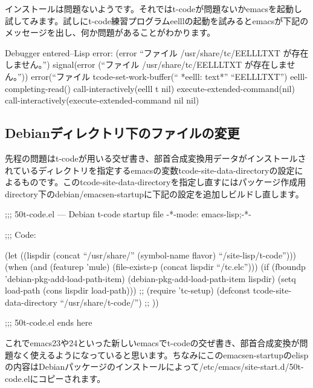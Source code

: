 \documentclass[mingoth,a4paper]{jsarticle}
\begin{document}
インストールは問題ないようです。それではt-codeが問題ないかemacsを起動し試してみます。試しにt-code練習プログラムeelllの起動を試みるとemacsが下記のメッセージを出し、何か問題があることがわかります。

\begin{commandline}
Debugger entered--Lisp error: (error ``ファイル /usr/share/tc/EELLLTXT が存在しません。'')
  signal(error (``ファイル /usr/share/tc/EELLLTXT が存在しません。''))
  error(``ファイル %
  tcode-set-work-buffer(`` *eelll: text*'' ``EELLLTXT'')
  eelll-completing-read()
  call-interactively(eelll t nil)
  execute-extended-command(nil)
  call-interactively(execute-extended-command nil nil)
\end{commandline}

\subsection{Debianディレクトリ下のファイルの変更}
先程の問題はt-codeが用いる交ぜ書き、部首合成変換用データがインストールされているディレクトリを指定するemacsの変数tcode-site-data-directoryの設定によるものです。このtcode-site-data-directoryを指定し直すにはパッケージ作成用directory下のdebian/emacsen-startupに下記の設定を追加しビルドし直します。

\begin{commandline}
;;; 50t-code.el --- Debian t-code startup file  -*-mode: emacs-lisp;-*-

;;; Code:

(let ((lispdir (concat ``/usr/share/'' (symbol-name flavor) ``/site-lisp/t-code'')))
  (when (and (featurep 'mule) (file-exists-p (concat lispdir ``/tc.elc'')))
    (if (fboundp 'debian-pkg-add-load-path-item)
        (debian-pkg-add-load-path-item lispdir)
      (setq load-path (cons lispdir load-path)))
    ;;
    (require 'tc-setup)
    (defconst tcode-site-data-directory ``/usr/share/t-code/'')
    ;;
    ))

;;; 50t-code.el ends here
\end{commandline}


これでemacs23や24といった新しいemacsでt-codeの交ぜ書き、部首合成変換が問題なく使えるようになっていると思います。ちなみにこのemacsen-startupのelispの内容はDebianパッケージのインストールによって/etc/emacs/site-start.d/50t-code.elにコピーされます。
\end{document}
